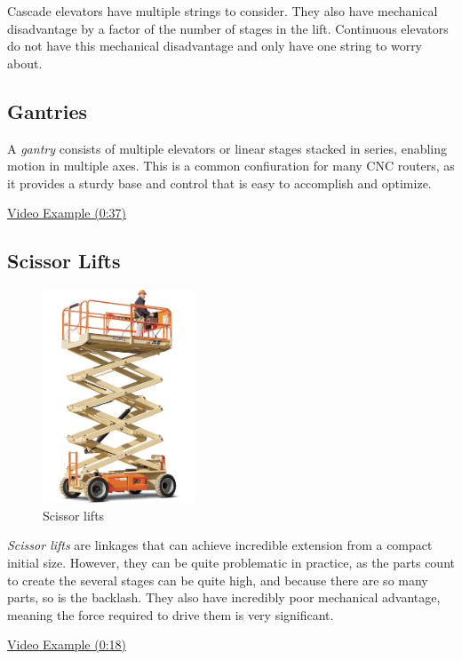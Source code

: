 Cascade elevators have multiple strings to consider. They also have mechanical disadvantage by a factor of the number of stages in the lift. Continuous elevators do not have this mechanical disadvantage and only have one string to worry about.

\subsection{Gantries}
A \textit{gantry} consists of multiple elevators or linear stages stacked in series, enabling motion in multiple axes. This is a common confiuration for many CNC routers, as it provides a sturdy base and control that is easy to accomplish and optimize.

\href{https://youtu.be/HJVGgaAJefo?t=37}{\color{red}\underline{Video Example (0:37)}}
\subsection{Scissor Lifts}
\begin{figure}[H]
	\includegraphics[height=2.5in]{imgs/scissorlift.jpeg}
	\caption{Scissor lifts}
\end{figure}

\textit{Scissor lifts} are linkages that can achieve incredible extension from a compact initial size. However, they can be quite problematic in practice, as the parts count to create the several stages can be quite high, and because there are so many parts, so is the backlash. They also have incredibly poor mechanical advantage, meaning the force required to drive them is very significant.

\href{https://youtu.be/J_VfCjKBGNw?t=18}{\color{red}\underline{Video Example (0:18)}}
